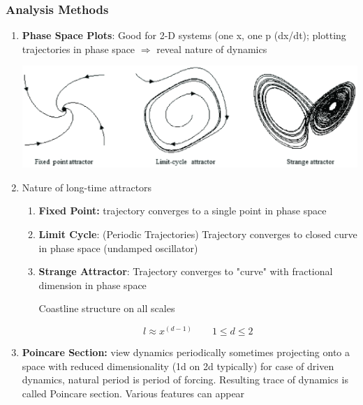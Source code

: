 \subsubsection{Analysis Methods}
\begin{enumerate}
    \item \textbf{Phase Space Plots}: Good for 2-D systems (one x, one p (dx/dt); plotting trajectories in phase space $\Rightarrow$ reveal nature of dynamics

    \includegraphics[width = \linewidth]{Images/attractor_types.png}
    

    \item Nature of long-time attractors

    \begin{enumerate}
        \item \textbf{Fixed Point:} trajectory converges to a single point in phase space
        
        \item \textbf{Limit Cycle}: (Periodic Trajectories) Trajectory converges to closed curve in phase space (undamped oscillator)
        
        \item \textbf{Strange Attractor}: Trajectory converges to "curve" with fractional dimension in phase space \newline 

        Coastline structure on all scales 

        \[ l \approx x^{(d-1)} \qquad 1 \le d \le 2 \]
        
    \end{enumerate}

    \item \textbf{Poincare Section:} view dynamics periodically sometimes projecting onto a space with reduced dimensionality (1d on 2d typically) for case of driven dynamics, natural period is period of forcing. Resulting trace of dynamics is called Poincare section. Various features can appear


\end{enumerate}
